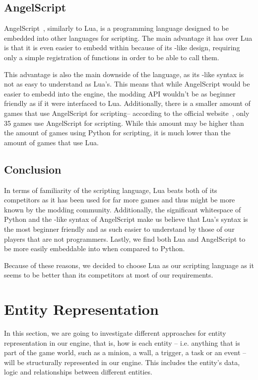 \subsection{AngelScript}

AngelScript~\cite{AngelScript}, similarly to Lua, is a programming language designed to be embedded into other languages for scripting.
The main advantage it has over Lua is that it is even easier to embedd within \cpp because of its \cpp-like design, requiring only
a simple registration of \cpp functions in order to be able to call them.

This advantage is also the main downside of the language, as its \cpp-like syntax is not as easy to understand as Lua's. This means that while
AngelScript would be easier to embedd into the engine, the modding API wouldn't be as beginner friendly as if it were interfaced
to Lua. Additionally, there is a smaller amount of games that use AngelScript for scripting-- according to the official
website~\cite{AngelScriptGames}, only 35 games use AngelScript for scripting. While this amount may be higher than the amount of games
using Python for scripting, it is much lower than the amount of games that use Lua.

\subsection{Conclusion}

In terms of familiarity of the scripting language, Lua beats both of its competitors as it has been used for far more games and thus
might be more known by the modding community. Additionally, the significant whitespace of Python and the \cpp-like syntax of AngelScript
make us believe that Lua's syntax is the most beginner friendly and as such easier to understand by those of our players that are not
programmers. Lastly, we find both Lua and AngelScript to be more easily embeddable into \cpp when compared to Python.

Because of these reasons, we decided to choose Lua as our scripting language as it seems to be better than its competitors at most
of our requirements.


\section{Entity Representation}

In this section, we are going to investigate different approaches for entity representation in our engine, that is, how is each
entity -- i.e. anything that is part of the game world, such as a minion, a wall, a trigger, a task or an event -- will be
structurally represented in our engine. This includes the entity's data, logic and relationships between different entities.

